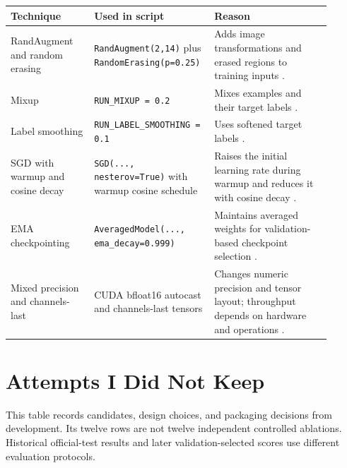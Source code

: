 \documentclass[11pt]{article}
\begin{document}
\begin{center}
\begin{tabular}{p{0.25\linewidth}p{0.30\linewidth}p{0.35\linewidth}}
\toprule
\textbf{Technique} & \textbf{Used in script} & \textbf{Reason} \\
\midrule
RandAugment and random erasing & \texttt{RandAugment(2,14)} plus
\texttt{RandomErasing(p=0.25)} & Adds image transformations and erased regions to training inputs
\cite{cubuk2020randaugment,zhong2020randomerasing}. \\
Mixup & \texttt{RUN\_MIXUP = 0.2} & Mixes examples and their target labels \cite{zhang2018mixup}. \\
Label smoothing & \texttt{RUN\_LABEL\_SMOOTHING = 0.1} & Uses softened target labels \cite{szegedy2016inception}. \\
SGD with warmup and cosine decay & \texttt{SGD(..., nesterov=True)} with warmup cosine
schedule & Raises the initial learning rate during warmup and reduces it with cosine decay \cite{goyal2017largebatch,loshchilov2017sgdr}. \\
EMA checkpointing & \texttt{AveragedModel(..., ema\_decay=0.999)} & Maintains averaged weights for validation-based checkpoint selection
\cite{izmailov2018swa,tarvainen2017meanteacher}. \\
Mixed precision and channels-last & CUDA bfloat16 autocast and channels-last tensors &
Changes numeric precision and tensor layout; throughput depends on hardware and operations
\cite{micikevicius2018mixed,pytorchchannelslast}. \\
\bottomrule
\end{tabular}
\end{center}

\clearpage
\section{Attempts I Did Not Keep}

This table records candidates, design choices, and packaging decisions from development. Its twelve rows are not twelve independent controlled ablations. Historical official-test results and later validation-selected scores use different evaluation protocols.
\end{document}
